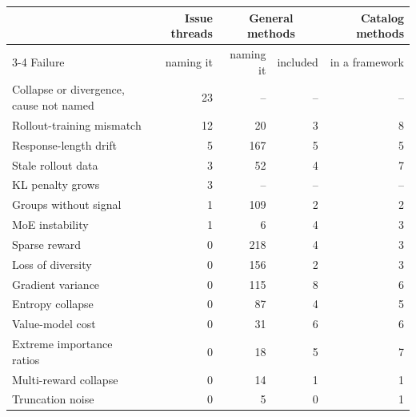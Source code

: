 \begin{tabular}{lrrrr}
\toprule
 & Issue threads & \multicolumn{2}{c}{General methods} & Catalog methods \\
\cmidrule(lr){3-4}
Failure & naming it & naming it & included & in a framework \\
\midrule
Collapse or divergence, cause not named & 23 & -- & -- & -- \\
Rollout-training mismatch & 12 & 20 & 3 & 8 \\
Response-length drift & 5 & 167 & 5 & 5 \\
Stale rollout data & 3 & 52 & 4 & 7 \\
KL penalty grows & 3 & -- & -- & -- \\
Groups without signal & 1 & 109 & 2 & 2 \\
MoE instability & 1 & 6 & 4 & 3 \\
Sparse reward & 0 & 218 & 4 & 3 \\
Loss of diversity & 0 & 156 & 2 & 3 \\
Gradient variance & 0 & 115 & 8 & 6 \\
Entropy collapse & 0 & 87 & 4 & 5 \\
Value-model cost & 0 & 31 & 6 & 6 \\
Extreme importance ratios & 0 & 18 & 5 & 7 \\
Multi-reward collapse & 0 & 14 & 1 & 1 \\
Truncation noise & 0 & 5 & 0 & 1 \\
\bottomrule
\end{tabular}
